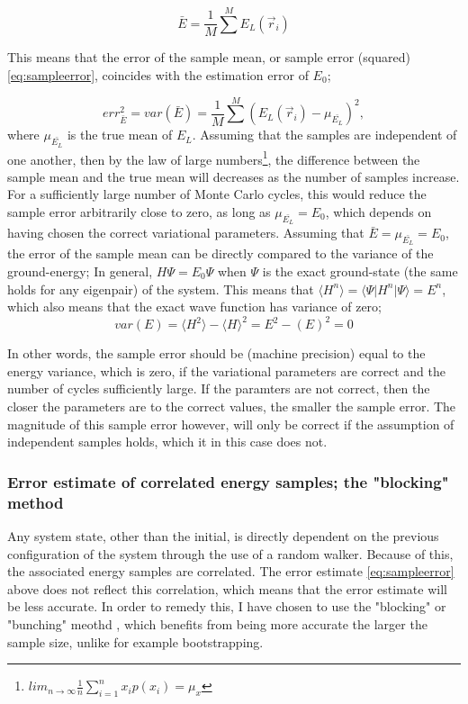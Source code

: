 \documentclass[%
oneside,                 %
final,                   %
10pt]{article}
\begin{document}
\begin{equation}
\bar{E}=\frac{1}{M}\sum^M E_L(\vec r_i)
\label{eq:estimated_energy}
\end{equation}

This means that the error of the sample mean, or sample error (squared) \eqref{eq:sampleerror}, coincides with the estimation error of $E_0$;

\begin{equation}
err^2_{\bar{E}}=var(\bar E)=\frac{1}{M} \sum^M (E_L(\vec r_i) - \mu_{\bar{E_L}})^2,
\label{eq:sampleerror}
\end{equation}
where $\mu_{\bar{E_L}}$ is the true mean of $E_L$. Assuming that the samples are independent of one another, then by the law of large numbers\footnote{ $ lim_{n\rightarrow \infty} \frac{1}{n} \sum^n_{i=1} x_i p(x_i)= \mu_x $}, the difference between the sample mean and the true mean will decreases as the number of samples increase. For a sufficiently large number of Monte Carlo cycles, this would reduce the sample error arbitrarily close to zero, as long as $\mu_{\bar{E_L}}=E_0$, which depends on having chosen the correct variational parameters. Assuming that $\bar{E}=\mu_{\bar{E_L}}=E_0$, the error of the sample mean can be directly compared to the variance of the ground-energy;
In general, $H\Psi = E_0 \Psi$ when $\Psi$ is the exact ground-state (the same holds for any eigenpair) of the system. This means that $\langle H^n \rangle=\langle \Psi \rvert H^n \lvert \Psi \rangle=E^n$, which also means that the exact wave function has variance of zero;
\begin{equation}
var(E)= \langle H^2 \rangle-\langle H \rangle^2 = E^2 -(E)^2= 0
\end{equation}

In other words, the sample error should be (machine precision) equal to the energy variance, which is zero, if the variational parameters are correct and the number of cycles sufficiently large. If the paramters are not correct, then the closer the parameters are to the correct values, the smaller the sample error. The magnitude of this sample error however, will only be correct if the assumption of independent samples holds, which it in this case does not.

\subsubsection{Error estimate of correlated energy samples; the "blocking" method} 
Any system state, other than the initial, is directly dependent on the previous configuration of the system through the use of a random walker. Because of this, the associated energy samples are correlated. The error estimate \eqref{eq:sampleerror} above does not reflect this correlation, which means that the error estimate will be less accurate. In order to remedy this, I have chosen to use the "blocking" or "bunching" meothd \cite {flyvebjerg}, which benefits from being more accurate the larger the sample size, unlike for example bootstrapping.
\end{document}

